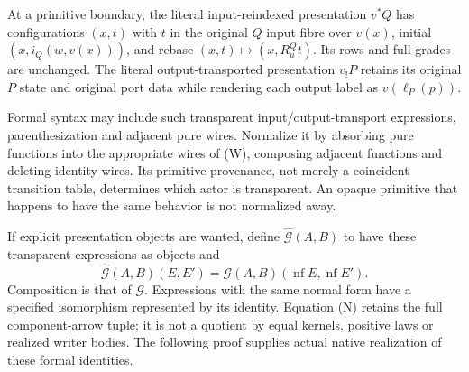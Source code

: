 \documentclass[11pt]{article}
\begin{document}
At a primitive boundary, the literal input-reindexed presentation $v^*Q$ has configurations $(x,t)$ with $t$ in the original $Q$ input fibre over $v(x)$, initial $(x,i_Q(w,v(x)))$, and rebase $(x,t)\mapsto(x,R^Q_u t)$. Its rows and full grades are unchanged. The literal output-transported presentation $v_!P$ retains its original $P$ state and original port data while rendering each output label as $v(\ell_P(p))$.

Formal syntax may include such transparent input/output-transport expressions, parenthesization and adjacent pure wires. Normalize it by absorbing pure functions into the appropriate wires of (W), composing adjacent functions and deleting identity wires. Its primitive provenance, not merely a coincident transition table, determines which actor is transparent. An opaque primitive that happens to have the same behavior is not normalized away.

If explicit presentation objects are wanted, define $\widehat{\mathcal G}(A,B)$ to have these transparent expressions as objects and
\[
 \widehat{\mathcal G}(A,B)(E,E')
 =\mathcal G(A,B)(\operatorname{nf}E,\operatorname{nf}E').  \tag{N}
\]
Composition is that of $\mathcal G$. Expressions with the same normal form have a specified isomorphism represented by its identity. Equation (N) retains the full component-arrow tuple; it is not a quotient by equal kernels, positive laws or realized writer bodies. The following proof supplies actual native realization of these formal identities.
\end{document}
